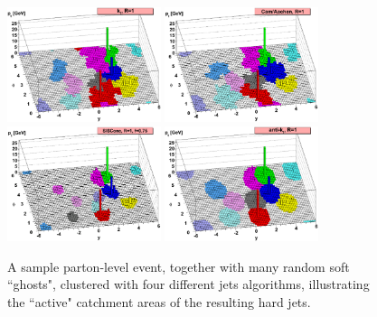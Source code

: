 \begin{figure}[h]
\begin{center}
\includegraphics*[width=0.40\textwidth] {figures/kt_stuff/kt}
\includegraphics*[width=0.40\textwidth] {figures/kt_stuff/ca}\\
\includegraphics*[width=0.40\textwidth] {figures/kt_stuff/siscone}
\includegraphics*[width=0.40\textwidth] {figures/kt_stuff/antikt}
\caption[A sample parton-level event]{A sample parton-level event, together with many random soft
``ghosts", clustered with four different jets algorithms, illustrating the ``active" catchment areas of
the resulting hard jets\cite{Cacciari:2008gp}.}
\label{fig:jetalgo}
\end{center}
\end{figure}

